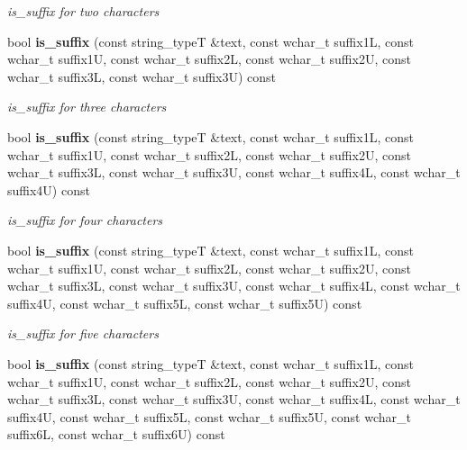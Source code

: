 \begin{DoxyCompactItemize}
\begin{DoxyCompactList}\small\item\em is\+\_\+suffix for two characters \end{DoxyCompactList}\item 
bool {\bf is\+\_\+suffix} (const string\+\_\+typeT \&text, const wchar\+\_\+t suffix1L, const wchar\+\_\+t suffix1U, const wchar\+\_\+t suffix2L, const wchar\+\_\+t suffix2U, const wchar\+\_\+t suffix3L, const wchar\+\_\+t suffix3U) const \label{classstemming_1_1stem_abbe6496d43b49dab0745e6d6b4e2831d}

\begin{DoxyCompactList}\small\item\em is\+\_\+suffix for three characters \end{DoxyCompactList}\item 
bool {\bf is\+\_\+suffix} (const string\+\_\+typeT \&text, const wchar\+\_\+t suffix1L, const wchar\+\_\+t suffix1U, const wchar\+\_\+t suffix2L, const wchar\+\_\+t suffix2U, const wchar\+\_\+t suffix3L, const wchar\+\_\+t suffix3U, const wchar\+\_\+t suffix4L, const wchar\+\_\+t suffix4U) const \label{classstemming_1_1stem_a694dd20e52adc89edadf120bf92a28ff}

\begin{DoxyCompactList}\small\item\em is\+\_\+suffix for four characters \end{DoxyCompactList}\item 
bool {\bf is\+\_\+suffix} (const string\+\_\+typeT \&text, const wchar\+\_\+t suffix1L, const wchar\+\_\+t suffix1U, const wchar\+\_\+t suffix2L, const wchar\+\_\+t suffix2U, const wchar\+\_\+t suffix3L, const wchar\+\_\+t suffix3U, const wchar\+\_\+t suffix4L, const wchar\+\_\+t suffix4U, const wchar\+\_\+t suffix5L, const wchar\+\_\+t suffix5U) const \label{classstemming_1_1stem_a001757aa7530b8acea05df8405def025}

\begin{DoxyCompactList}\small\item\em is\+\_\+suffix for five characters \end{DoxyCompactList}\item 
bool {\bf is\+\_\+suffix} (const string\+\_\+typeT \&text, const wchar\+\_\+t suffix1L, const wchar\+\_\+t suffix1U, const wchar\+\_\+t suffix2L, const wchar\+\_\+t suffix2U, const wchar\+\_\+t suffix3L, const wchar\+\_\+t suffix3U, const wchar\+\_\+t suffix4L, const wchar\+\_\+t suffix4U, const wchar\+\_\+t suffix5L, const wchar\+\_\+t suffix5U, const wchar\+\_\+t suffix6L, const wchar\+\_\+t suffix6U) const \label{classstemming_1_1stem_abe83f7592028b43f5cec9ce35ae1d9df}


\end{DoxyCompactItemize}

